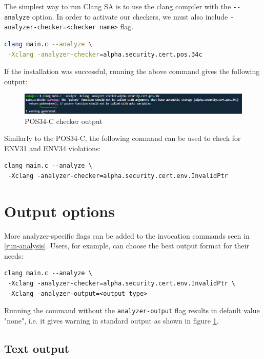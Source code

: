 The simplest way to run Clang SA is to use the clang compiler with the \lstinline{--analyze} option. In order to activate our checkers, we must also include \lstinline{-analyzer-checker=<checker name>} flag. 



\begin{lstlisting}[caption={},label={lst:running-pos34},language={bash}]
clang main.c --analyze \
 -Xclang -analyzer-checker=alpha.security.cert.pos.34c
\end{lstlisting}

If the installation was successful, running the above command gives the following output:

\begin{figure}[H]
	\centering
	\includegraphics[width=\textwidth]{images/new_pos34.PNG}
	\caption{POS34-C checker output}
	\label{fig:pos34termin}
\end{figure}


Similarly to the POS34-C, the following command can be used to check for ENV31 and ENV34 violations: 
\begin{lstlisting}[caption={},label={lst:running-env}]
clang main.c --analyze \
 -Xclang -analyzer-checker=alpha.security.cert.env.InvalidPtr
\end{lstlisting}

\section{Output options}
More analyzer-specific flags can be added to the invocation commands seen in \ref{run-analysis}.
Users, for example, can choose the best output format for their needs: 
\begin{lstlisting}[caption={},label={lst:output-flag}]
clang main.c --analyze \
 -Xclang -analyzer-checker=alpha.security.cert.env.InvalidPtr \
 -Xclang -analyzer-output=<output type>
\end{lstlisting}

Running the command without the \lstinline{analyzer-output} flag results in default value "none", i.e. it gives warning in standard output as shown in figure \ref{fig:pos34termin}.

\subsection{Text output} \label{text-output}

